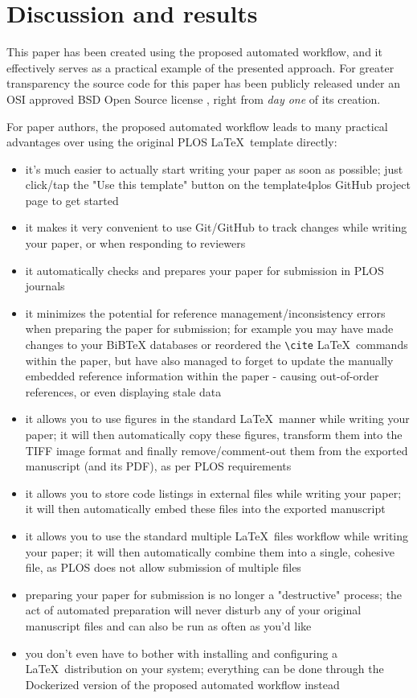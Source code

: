 \section*{Discussion and results}

This paper has been created using the proposed automated workflow, and it effectively serves as a practical example of the presented approach.
For greater transparency the source code for this paper \cite{paper:code} has been publicly released under an OSI approved BSD Open Source license \cite{OSI:BSD}, right from \emph{day one} of its creation.

For paper authors, the proposed automated workflow leads to many practical advantages over using the original PLOS \LaTeX~template directly:

\begin{itemize}
    \item it's much easier to actually start writing your paper as soon as possible; just click/tap the "Use this template" button on the template4plos GitHub project page \cite{template4plos} to get started
    \item it makes it very convenient to use Git/GitHub to track changes while writing your paper, or when responding to reviewers
    \item it automatically checks and prepares your paper for submission in PLOS journals
    \item it minimizes the potential for reference management/inconsistency errors when preparing the paper for submission; for example you may have made changes to your BiBTeX databases or reordered the \verb|\cite| \LaTeX~commands within the paper, but have also managed to forget to update the manually embedded reference information within the paper - causing out-of-order references, or even displaying stale data
    \item it allows you to use figures in the standard \LaTeX~manner while writing your paper; it will then automatically copy these figures, transform them into the TIFF image format and finally remove/comment-out them from the exported  manuscript (and its PDF), as per PLOS requirements
    \item it allows you to store code listings in external files while writing your paper; it will then automatically embed these files into the exported  manuscript
    \item it allows you to use the standard multiple \LaTeX~files workflow while writing your paper; it will then automatically combine them into a single, cohesive  file, as PLOS does not allow submission of multiple  files
    \item preparing your paper for submission is no longer a "destructive" process; the act of automated preparation will never disturb any of your original manuscript files and can also be run as often as you'd like
    \item you don't even have to bother with installing and configuring a \LaTeX~distribution on your system; everything can be done through the Dockerized version of the proposed automated workflow instead
\end{itemize}
